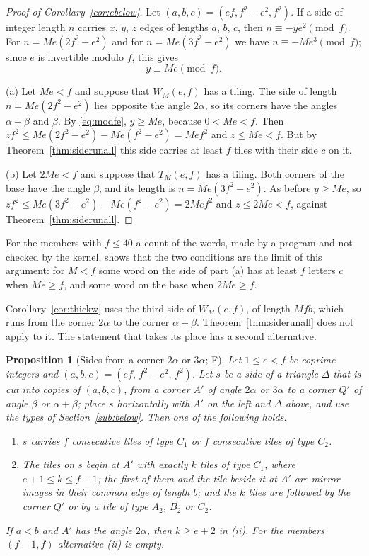 \documentclass[11pt,reqno]{amsart}
\theoremstyle{plain}
\newtheorem{proposition}[theorem]{Proposition}
\theoremstyle{definition}
\newcommand{\sF}{\textup{\textsf{F}}}
\begin{document}
\begin{proof}[Proof of Corollary~\ref{cor:ebelow}]
Let $(a,b,c)=(ef,f^2-e^2,f^2)$. If a side of integer length $n$ carries $x$, $y$, $z$ edges of lengths $a$,
$b$, $c$, then $n\equiv-ye^2\pmod f$. For $n=Me(2f^2-e^2)$ and for $n=Me(3f^2-e^2)$ we have
$n\equiv-Me^3\pmod f$; since $e$ is invertible modulo $f$, this gives
\begin{equation}\label{eq:modfe}
y\equiv Me\pmod f .
\end{equation}

(a) Let $Me<f$ and suppose that $W_M(e,f)$ has a tiling. The side of length $n=Me(2f^2-e^2)$ lies opposite
the angle $2\alpha$, so its corners have the angles $\alpha+\beta$ and $\beta$. By \eqref{eq:modfe},
$y\ge Me$, because $0<Me<f$. Then $zf^2\le Me(2f^2-e^2)-Me(f^2-e^2)=Mef^2$ and $z\le Me<f$. But by
Theorem~\ref{thm:siderunall} this side carries at least $f$ tiles with their side $c$ on it.

(b) Let $2Me<f$ and suppose that $T_M(e,f)$ has a tiling. Both corners of the base have the angle $\beta$,
and its length is $n=Me(3f^2-e^2)$. As before $y\ge Me$, so $zf^2\le Me(3f^2-e^2)-Me(f^2-e^2)=2Mef^2$ and
$z\le2Me<f$, against Theorem~\ref{thm:siderunall}.
\end{proof}

For the members with $f\le40$ a count of the words, made by a program and not checked by the kernel, shows
that the two conditions are the limit of this argument: for $M<f$ some word on the side of part (a) has at
least $f$ letters $c$ when $Me\ge f$, and some word on the base when $2Me\ge f$.

Corollary~\ref{cor:thickw} uses the third side of $W_M(e,f)$, of length $Mfb$, which runs from the corner
$2\alpha$ to the corner $\alpha+\beta$. Theorem~\ref{thm:siderunall} does not apply to it. The statement
that takes its place has a second alternative.

\begin{proposition}[Sides from a corner $2\alpha$ or $3\alpha$; \sF]\label{prop:cornerrun}
Let $1\le e<f$ be coprime integers and $(a,b,c)=(ef,\,f^2-e^2,\,f^2)$. Let $s$ be a side of a triangle
$\Delta$ that is cut into copies of $(a,b,c)$, from a corner $A'$ of angle $2\alpha$ or $3\alpha$ to a
corner $Q'$ of angle $\beta$ or $\alpha+\beta$; place $s$ horizontally with $A'$ on the left and $\Delta$
above, and use the types of Section~\ref{sub:below}. Then one of the following holds.
\begin{enumerate}
\item[\textup{(i)}] $s$ carries $f$ consecutive tiles of type $C_1$ or $f$ consecutive tiles of type $C_2$.
\item[\textup{(ii)}] The tiles on $s$ begin at $A'$ with exactly $k$ tiles of type $C_1$, where
$e+1\le k\le f-1$; the first of them and the tile beside it at $A'$ are mirror images in their common edge
of length $b$; and the $k$ tiles are followed by the corner $Q'$ or by a tile of type $A_2$, $B_2$ or $C_2$.
\end{enumerate}
If $a<b$ and $A'$ has the angle $2\alpha$, then $k\ge e+2$ in \textup{(ii)}. For the members $(f-1,f)$
alternative \textup{(ii)} is empty.
\end{proposition}
\end{document}
